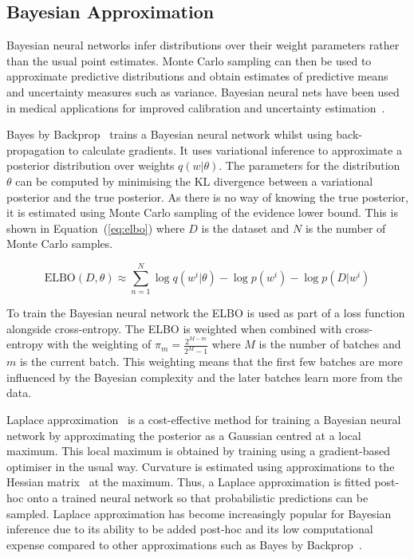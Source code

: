 \subsection{Bayesian Approximation}
\label{subsec:bayesian_calibration}
Bayesian neural networks infer distributions over their weight parameters rather than the usual point estimates. Monte Carlo sampling can then be used to approximate predictive distributions and obtain estimates of predictive means and uncertainty measures such as variance. Bayesian neural nets have been used in medical applications for improved calibration and uncertainty estimation~\citep{kwon2020uncertainty}.

Bayes by Backprop~\citep{blundell2015weight} trains a Bayesian neural network whilst using back-propagation to calculate gradients. It uses variational inference to approximate a posterior distribution over weights $q(w|\theta)$. The parameters for the distribution $\theta$ can be computed by minimising the KL divergence between a variational posterior and the true posterior. As there is no way of knowing the true posterior, it is estimated using Monte Carlo sampling of the evidence lower bound. This is shown in Equation~(\ref{eq:elbo}) where $D$ is the dataset and $N$ is the number of Monte Carlo samples.

\begin{equation}
	\text{ELBO}(D, \theta) \approx \sum^N_{n=1}\log q(w^i|\theta)-\log p(w^i) - \log p(D|w^i)
	\label{eq:elbo}
\end{equation}

To train the Bayesian neural network the ELBO is used as part of a loss function alongside cross-entropy. The ELBO is weighted when combined with cross-entropy with the weighting of $\pi_m = \frac{2^{M-m}}{2^M-1}$ where $M$ is the number of batches and $m$ is the current batch. This weighting means that the first few batches are more influenced by the Bayesian complexity and the later batches learn more from the data.

Laplace approximation~\citep{mackay1992bayesian} is a cost-effective method for training a Bayesian neural network by approximating the posterior as a Gaussian centred at a local maximum. This local maximum is obtained by training using a gradient-based optimiser in the usual way. Curvature is estimated using approximations to the Hessian matrix~\citep{botev2017practical} at the maximum. Thus, a Laplace approximation is fitted post-hoc onto a trained neural network so that probabilistic predictions can be sampled. Laplace approximation has become increasingly popular for Bayesian inference due to its ability to be added post-hoc and its low computational expense compared to other approximations such as Bayes by Backprop~\citep{daxberger2021laplace}.



